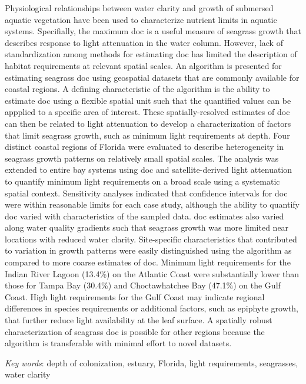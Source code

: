 \documentclass[letterpaper,12pt,oneside]{article}\usepackage[]{graphicx}\usepackage[]{color}
\begin{document}
Physiological relationships between water clarity and growth of submersed aquatic vegetation have been used to  characterize nutrient limits in aquatic systems.  Specifially, the maximum \ac{doc} is a useful measure of seagrass growth that describes response to light attenuation in the water column.  However, lack of standardization among methods for estimating \ac{doc} has limited the description of habitat requirements at relevant spatial scales.  An algorithm is presented for estimating seagrass \ac{doc} using geospatial datasets that are commonly available for coastal regions.  A defining characteristic of the algorithm is the ability to estimate \ac{doc} using a flexible spatial unit such that the quantified values can be appplied to a specific area of interest.  These spatially-resolved estimates of \ac{doc} can then be related to light attenuation to develop a characterization of factors that limit seagrass growth, such as minimum light requirements at depth.  Four distinct coastal regions of Florida were evaluated to describe heterogeneity in seagrass growth patterns on relatively small spatial scales.  The analysis was extended to entire bay systems using \ac{doc} and satellite-derived light attenuation to quantify minimum light requirements on a broad scale using a systematic spatial context.  Sensitivity analyses indicated that confidence intervals for \ac{doc} were within reasonable limits for each case study, although the ability to quantify \ac{doc} varied with characteristics of the sampled data.  \ac{doc} estimates also varied along water quality gradients such that seagrass growth was more limited near locations with reduced water clarity. Site-specific characteristics that contributed to variation in growth patterns were easily distinguished using the algorithm as compared to more coarse estimates of \ac{doc}.  Minimum light requirements for the Indian River Lagoon (13.4\%) on the Atlantic Coast were substantially lower than those for Tampa Bay (30.4\%) and Choctawhatchee Bay (47.1\%) on the Gulf Coast.  High light requirements for the Gulf Coast may indicate regional differences in species requirements or additional factors, such as epiphyte growth, that further reduce light availability at the leaf surface.  A spatially robust characterization of seagrass \ac{doc} is possible for other regions because the algorithm is transferable with minimal effort to novel datasets.

\noindent \textit{Key words}: depth of colonization, estuary, Florida, light requirements, seagrasses, water clarity
\end{document}
